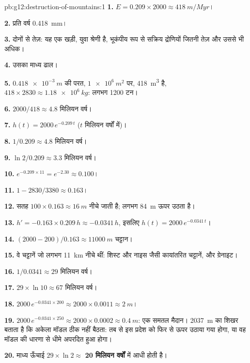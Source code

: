 \begin{solution}{pb:g12:destruction-of-mountains:1}
\textbf{1.} $E = 0.209 \times 2000 \approx \qty{418}{m/Myr}$।

\textbf{2.} प्रति वर्ष \qty{0.418}{mm}।

\textbf{3.} दोनों से तेज़: यह एक खड़ी, युवा श्रेणी है, भूकंपीय रूप से सक्रिय
द्रोणियों जितनी तेज़ और उससे भी अधिक।

\textbf{4.} उसका माध्य ढाल।

\textbf{5.} $\qty{0.418e-3}{m}$ की परत, $\qty{1e6}{m^2}$ पर,
\qty{418}{m^3} है, $418 \times 2830 \approx \qty{1.18e6}{kg}$: लगभग 1200
टन।

\textbf{6.} $2000/418 \approx 4.8$ मिलियन वर्ष।

\textbf{7.} $h(t) = 2000\,e^{-0.209\,t}$ ($t$ मिलियन वर्षों में)।

\textbf{8.} $1/0.209 \approx 4.8$ मिलियन वर्ष।

\textbf{9.} $\ln 2/0.209 \approx 3.3$ मिलियन वर्ष।

\textbf{10.} $e^{-0.209 \times 11} = e^{-2.30} \approx 0.100$।

\textbf{11.} $1 - 2830/3380 \approx 0.163$।

\textbf{12.} सतह $100 \times 0.163 \approx \qty{16}{m}$ नीचे जाती है;
 लगभग \qty{84}{m} ऊपर उठता है।

\textbf{13.} $h' = -0.163 \times 0.209\,h \approx -0.0341\,h$, इसलिए $h(t) =
2000\,e^{-0.0341\,t}$।

\textbf{14.} $(2000 - 200)/0.163 \approx \qty{11000}{m}$ चट्टान।

\textbf{15.} वे चट्टानें जो लगभग \qty{11}{km} नीचे थीं: शिस्ट और नाइस जैसी कायांतरित
चट्टानें, और ग्रेनाइट।

\textbf{16.} $1/0.0341 \approx 29$ मिलियन वर्ष।

\textbf{17.} $29 \times \ln 10 \approx 67$ मिलियन वर्ष।

\textbf{18.} $2000\,e^{-0.0341 \times 200} \approx 2000 \times 0.0011 \approx
\qty{2}{m}$।

\textbf{19.} $2000\,e^{-0.0341 \times 250} \approx 2000 \times 0.0002 \approx
\qty{0.4}{m}$: एक समतल मैदान। \qty{2037}{m} का शिखर बताता है कि अकेला
मॉडल ठीक नहीं बैठता: तब से इस प्रदेश को फिर से ऊपर उठाया गया होगा, या वह
मॉडल की धारणा से धीमे अपरदित हुआ होगा।

\textbf{20.} माध्य ऊँचाई $29 \times \ln 2 \approx$
\textbf{20 मिलियन वर्षों} में आधी होती है।
\end{solution}
